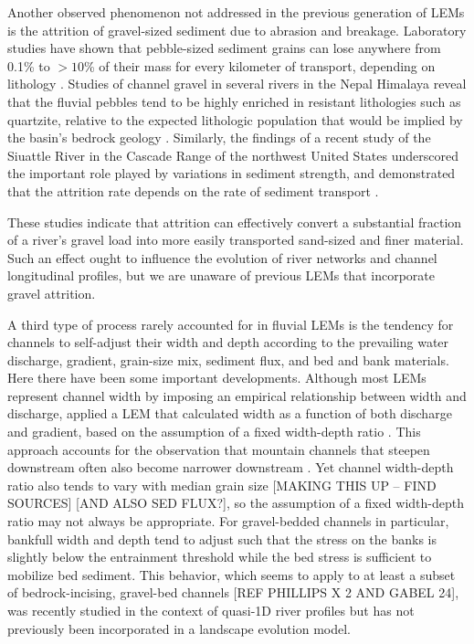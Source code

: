 \documentclass[journal abbreviation, manuscript]{copernicus}
\begin{document}
Another observed phenomenon not addressed in the previous generation of LEMs is the attrition of gravel-sized sediment due to abrasion and breakage. Laboratory studies have shown that pebble-sized sediment grains can lose anywhere from 0.1\% to $>10$\% of their mass for every kilometer of transport, depending on lithology \citep{attal2009pebble}. Studies of channel gravel in several rivers in the Nepal Himalaya reveal that the fluvial pebbles tend to be highly enriched in resistant lithologies such as quartzite, relative to the expected lithologic population that would be implied by the basin's bedrock geology \citep{attal2006changes,dingle2017}. Similarly, the findings of a recent study of the Siuattle River in the Cascade Range of the northwest United States underscored the important role played by variations in sediment strength, and demonstrated that the attrition rate depends on the rate of sediment transport \citep{pfeiffer2022survival}.

These studies indicate that attrition can effectively convert a substantial fraction of a river's gravel load into more easily transported sand-sized and finer material. Such an effect ought to influence the evolution of river networks and channel longitudinal profiles, but we are unaware of previous LEMs that incorporate gravel attrition.

A third type of process rarely accounted for in fluvial LEMs is the tendency for channels to self-adjust their width and depth according to the prevailing water discharge, gradient, grain-size mix, sediment flux, and bed and bank materials. Here there have been some important developments. Although most LEMs represent channel width by imposing an empirical relationship between width and discharge,  \citet{attal2008modeling} applied a LEM that calculated width as a function of both discharge and gradient, based on the assumption of a fixed width-depth ratio  \citep{finnegan2005}. This approach accounts for the observation that mountain channels that steepen downstream often also become narrower downstream \citep[e.g.,][]{lave2001fluvial,whittaker2007bedrock}. Yet channel width-depth ratio also tends to vary with median grain size [MAKING THIS UP -- FIND SOURCES] [AND ALSO SED FLUX?], so the assumption of a fixed width-depth ratio may not always be appropriate. For gravel-bedded channels in particular, bankfull width and depth tend to adjust such that the stress on the banks is slightly below the entrainment threshold while the bed stress is sufficient to mobilize bed sediment. This behavior, which seems to apply to at least a subset of bedrock-incising, gravel-bed channels [REF PHILLIPS X 2 AND GABEL 24], was recently studied in the context of quasi-1D river profiles but has not previously been incorporated in a landscape evolution model.
\end{document}
